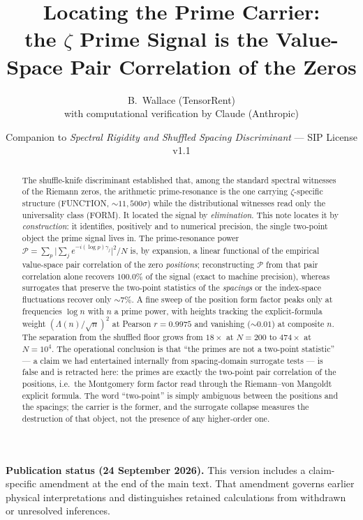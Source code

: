 \documentclass[11pt]{article}
\title{\textbf{Locating the Prime Carrier:\\
the $\zeta$ Prime Signal is the Value-Space Pair Correlation of the Zeros}}
\author{B.\ Wallace \quad (TensorRent)\\ \small with computational verification by Claude (Anthropic)}
\date{\small Companion to \textit{Spectral Rigidity and Shuffled Spacing Discriminant} --- SIP License v1.1}
\begin{document}
\maketitle

\begin{abstract}
The shuffle-knife discriminant established that, among the standard spectral witnesses of the Riemann zeros, the arithmetic prime-resonance is the one carrying $\zeta$-specific structure (FUNCTION, $\sim\!11{,}500\sigma$) while the distributional witnesses read only the universality class (FORM). It located the signal by \emph{elimination}. This note locates it by \emph{construction}: it identifies, positively and to numerical precision, the single two-point object the prime signal lives in. The prime-resonance power $\mathcal P=\sum_p\lvert\sum_j e^{-i(\log p)\gamma_j}\rvert^2/N$ is, by expansion, a linear functional of the empirical value-space pair correlation of the zero \emph{positions}; reconstructing $\mathcal P$ from that pair correlation alone recovers $100.0\%$ of the signal (exact to machine precision), whereas surrogates that preserve the two-point statistics of the \emph{spacings} or the index-space fluctuations recover only $\sim\!7\%$. A fine sweep of the position form factor peaks only at frequencies $\log n$ with $n$ a prime power, with heights tracking the explicit-formula weight $(\Lambda(n)/\sqrt n)^2$ at Pearson $r=0.9975$ and vanishing ($\sim\!0.01$) at composite $n$. The separation from the shuffled floor grows from $18\times$ at $N=200$ to $474\times$ at $N=10^4$. The operational conclusion is that ``the primes are not a two-point statistic'' --- a claim we had entertained internally from spacing-domain surrogate tests --- is false and is retracted here: the primes are exactly the two-point pair correlation of the positions, i.e.\ the Montgomery form factor read through the Riemann--von Mangoldt explicit formula. The word ``two-point'' is simply ambiguous between the positions and the spacings; the carrier is the former, and the surrogate collapse measures the destruction of that object, not the presence of any higher-order one.
\end{abstract}
\par\smallskip\noindent\textbf{Publication status (24 September 2026).}
This version includes a claim-specific amendment at the end of the main text.
That amendment governs earlier physical interpretations and distinguishes
retained calculations from withdrawn or unresolved inferences.\par\smallskip
\end{document}
